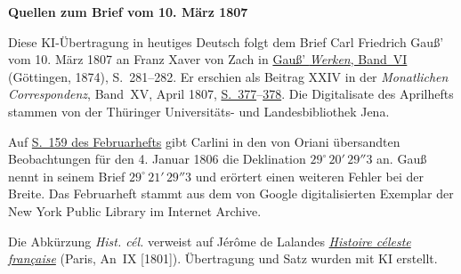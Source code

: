 \clearpage\thispagestyle{empty}
\begin{center}\textbf{Quellen zum Brief vom 10. März 1807}\end{center}
\noindent Diese KI-Übertragung in heutiges Deutsch folgt dem Brief Carl Friedrich Gauß’ vom 10. März 1807 an Franz Xaver von Zach in \href{https://gdz.sub.uni-goettingen.de/id/PPN236007467}{Gauß’ \textit{Werken}, Band~VI} (Göttingen, 1874), S.~281--282. Er erschien als Beitrag XXIV in der \textit{Monatlichen Correspondenz}, Band~XV, April 1807, \href{https://zs.thulb.uni-jena.de/rsc/viewer/jportal_derivate_00237836/Monatliche_Correspondenz_130168688_15_1807_0380.tif}{S.~377}--\href{https://zs.thulb.uni-jena.de/rsc/viewer/jportal_derivate_00237836/Monatliche_Correspondenz_130168688_15_1807_0381.tif}{378}. Die Digitalisate des Aprilhefts stammen von der Thüringer Universitäts- und Landesbibliothek Jena.
\par\medskip
Auf \href{https://archive.org/details/bub_gb_sKAAAAAAMAAJ/page/n164/mode/1up}{S.~159 des Februarhefts} gibt Carlini in den von Oriani übersandten Beobachtungen für den 4. Januar 1806 die Deklination $29^\circ\,20'\,29''3$ an. Gauß nennt in seinem Brief $29^\circ\,21'\,29''3$ und erörtert einen weiteren Fehler bei der Breite. Das Februarheft stammt aus dem von Google digitalisierten Exemplar der New York Public Library im Internet Archive.
\par\medskip
Die Abkürzung \emph{Hist. cél.} verweist auf Jérôme de Lalandes \href{https://archive.org/download/histoireclestef00lalagoog/page/n12.jpg}{\textit{Histoire céleste française}} (Paris, An~IX [1801]). Übertragung und Satz wurden mit KI erstellt.
\clearpage
